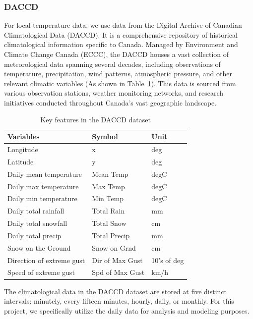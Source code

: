 \documentclass[12pt]{article}
\begin{document}
\subsubsection{DACCD}

For local temperature data, we use data from the Digital Archive of Canadian Climatological Data (DACCD). It is a comprehensive repository of historical climatological information specific to Canada. Managed by Environment and Climate Change Canada (ECCC), the DACCD houses a vast collection of meteorological data spanning several decades, including observations of temperature, precipitation, wind patterns, atmospheric pressure, and other relevant climatic variables (As shown in Table~\ref{tab:DACCD}). This data is sourced from various observation stations, weather monitoring networks, and research initiatives conducted throughout Canada's vast geographic landscape.

\begin{table}[htpb]
	\centering
	\caption{Key features in the DACCD dataset}
	\label{tab:DACCD}
	\begin{tabular}{lll}
	\toprule
	 Variables & Symbol & Unit\\
	\midrule
	Longitude & x & deg\\
	Latitude & y & deg\\
	Daily mean temperature & Mean Temp & degC\\
	Daily max temperature & Max Temp & degC\\
	Daily min temperature & Min Temp & degC\\
	Daily total rainfall & Total Rain & mm\\
	Daily total snowfall & Total Snow & cm\\
	Daily total precip & Total Precip & mm\\
	Snow on the Ground& Snow on Grnd & cm\\
	Direction of extreme gust & Dir of Max Gust & 10's of deg\\
	Speed of extreme gust & Spd of Max Gust & km/h\\
	\bottomrule
	\end{tabular}
\end{table}

The climatological data in the DACCD dataset are stored at five distinct intervals: minutely, every fifteen minutes, hourly, daily, or monthly. For this project, we specifically utilize the daily data for analysis and modeling purposes.
\end{document}
